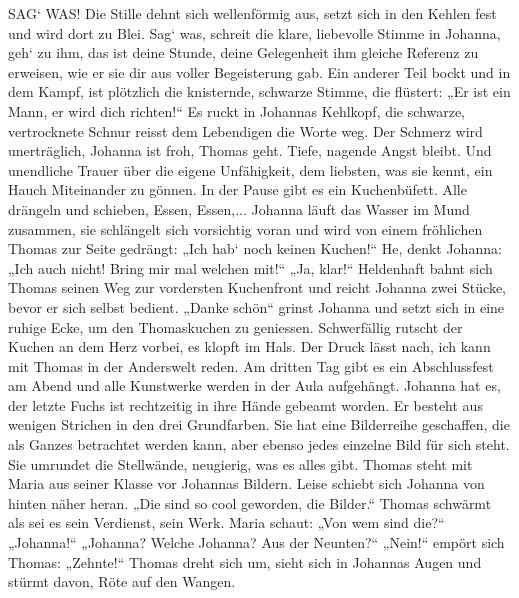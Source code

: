 SAG` WAS! Die Stille dehnt sich wellenförmig aus, setzt sich in den Kehlen fest und wird dort zu Blei. Sag` was, schreit die klare, liebevolle Stimme in Johanna, geh` zu ihm, das ist deine Stunde, deine Gelegenheit ihm gleiche Referenz zu erweisen, wie er sie dir aus voller Begeisterung gab.
Ein anderer Teil bockt und in dem Kampf, ist plötzlich die knisternde, schwarze Stimme, die flüstert: „Er ist ein Mann, er wird dich richten!“ Es ruckt in Johannas Kehlkopf, die schwarze, vertrocknete Schnur reisst dem Lebendigen die Worte weg. Der Schmerz wird unerträglich, Johanna ist froh, Thomas geht. Tiefe, nagende Angst bleibt. Und unendliche Trauer über die eigene Unfähigkeit, dem liebsten, was sie kennt, ein Hauch Miteinander zu gönnen.
In der Pause gibt es ein Kuchenbüfett. Alle drängeln und schieben, Essen, Essen,...
Johanna läuft das Wasser im Mund zusammen, sie schlängelt sich vorsichtig voran und wird von einem fröhlichen Thomas zur Seite gedrängt: „Ich hab` noch keinen Kuchen!“ He, denkt Johanna: „Ich auch nicht! Bring mir mal welchen mit!“ „Ja, klar!“ Heldenhaft  bahnt sich Thomas seinen Weg zur vordersten Kuchenfront und reicht Johanna  zwei Stücke, bevor er sich selbst bedient. „Danke schön“ grinst Johanna und setzt sich in eine ruhige Ecke, um den Thomaskuchen zu geniessen. Schwerfällig rutscht der  Kuchen an dem Herz vorbei, es klopft im Hals. Der Druck lässt nach, ich kann mit Thomas in der Anderswelt reden.
Am dritten Tag gibt es ein Abschlussfest am Abend und alle Kunstwerke werden in der Aula aufgehängt. Johanna hat es, der letzte Fuchs ist rechtzeitig in ihre Hände gebeamt worden. Er besteht aus wenigen Strichen in den drei Grundfarben. Sie hat eine Bilderreihe geschaffen, die als Ganzes betrachtet werden kann, aber ebenso jedes einzelne Bild für sich steht.
Sie umrundet die Stellwände, neugierig, was es alles gibt. Thomas steht mit Maria aus seiner Klasse vor Johannas Bildern. Leise schiebt sich Johanna von hinten näher heran. „Die sind so cool geworden, die Bilder.“ Thomas schwärmt als sei es sein Verdienst, sein Werk. Maria schaut: „Von wem sind die?“ „Johanna!“ „Johanna? Welche Johanna? Aus der Neunten?“ „Nein!“ empört sich Thomas: „Zehnte!“ Thomas dreht sich um, sieht sich in Johannas Augen und stürmt davon, Röte auf den Wangen.

